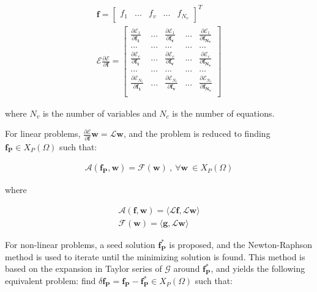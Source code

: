 \documentclass{CFD2011}
\begin{document}
\begin{eqnarray}
\mathbf{f}=\left[ \begin{array}{ccccc} f_1 & ... & f_{v} & ... & f_{N_v} \end{array} \right]^T \nonumber\\
 {\mathcal{E}} {\frac{\partial\mathcal{E}}{\partial \mathbf{f}}}=\left[ \begin{array}{ccccc}
 {\frac{\partial\mathcal{E}_{1}}{\partial \mathbf{f_1}}} & ... &  {\frac{\partial\mathcal{E}_{1}}{\partial \mathbf{f_v}}} & ... &  {\frac{\partial\mathcal{E}_{1}}{\partial \mathbf{f_{N_v}}}} \\
... & ... & ... & ... & ... \\
 {\frac{\partial\mathcal{E}_{c}}{\partial \mathbf{f_{1}}}} & ... &  {\frac{\partial\mathcal{E}_{c}}{\partial \mathbf{f_{v}}}} & ... &  {\frac{\partial\mathcal{E}_{c}}{\partial \mathbf{f_{N_v}}}} \\
... & ... & ... & ... & ... \\
 {\frac{\partial\mathcal{E}_{N_c}}{\partial \mathbf{f_{1}}}} & ... &  {\frac{\partial\mathcal{E}_{N_c}}{\partial \mathbf{f_{v}}}} & ... &  {\frac{\partial\mathcal{E}_{N_c}}{\partial \mathbf{f_{N_v}}}} \\
\end{array} \right] 
\label{eq:eqOp}
\end{eqnarray}

\noindent where $N_v$ is the number of variables and $N_c$ is the number of equations.

For linear problems, $\frac{\partial\mathcal{E}}{\partial \mathbf{f}}\mathbf{w}=\mathcal{L}\mathbf{w}$, and the problem is reduced to finding $\mathbf{f_P} \in X_P(\Omega)$ such that:


\begin{eqnarray}
\mathcal{A}(\mathbf{f_P},\mathbf{w})=\mathcal{F}(\mathbf{w}) \ ,\ \forall \mathbf{w} \ \in X_P(\Omega)
\label{eq:equivalent}
\end{eqnarray}

\noindent where

\begin{eqnarray}
\mathcal{A}(\mathbf{f},\mathbf{w})= \langle \mathcal{L}\mathbf{f},\mathcal{L}\mathbf{w} \rangle \nonumber \\ 
\mathcal{F}(\mathbf{w})= \langle \mathbf{g},\mathcal{L}\mathbf{w} \rangle 
\label{eq:equivLinear}
\end{eqnarray}




For non-linear problems, a seed solution $\mathbf{f^*_P}$ is proposed, and the Newton-Raphson method is used to iterate until the minimizing solution is found. This method is based on the expansion in Taylor series of $\mathcal{G}$ around $\mathbf{f^*_P}$, and yields the following equivalent problem: find $\delta\mathbf{f_P}=\mathbf{f_P}-\mathbf{f^*_P} \in X_P(\Omega)$ such that:
\end{document}
